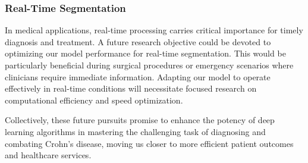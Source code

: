 \subsubsection*{Real-Time Segmentation}
In medical applications, real-time processing carries critical importance for timely diagnosis and treatment. A future research objective could be devoted to optimizing our model performance for real-time segmentation. This would be particularly beneficial during surgical procedures or emergency scenarios where clinicians require immediate information. Adapting our model to operate effectively in real-time conditions will necessitate focused research on computational efficiency and speed optimization.

Collectively, these future pursuits promise to enhance the potency of deep learning algorithms in mastering the challenging task of diagnosing and combating Crohn's disease, moving us closer to more efficient patient outcomes and healthcare services.



